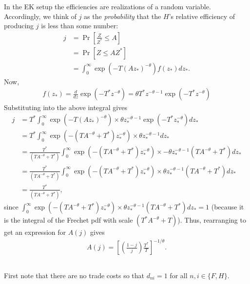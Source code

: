 \documentclass[12pt]{article}
\begin{document}
In the EK setup the efficiencies are realizations of a random variable. Accordingly, we think of $j$ as the \textit{probability} that the $H$'s relative efficiency of producing $j$ is less than some number:
\begin{align*}
j &= \Pr\left[\frac{Z}{Z^*} \leq A\right]\\
&=\Pr\left[Z \leq AZ^*\right]\\
&= \int_0^\infty \exp(-T(Az_*)^{-\theta}) f(z_*)dz_*.
\end{align*}
Now,
\begin{align*}
f(z_*) = \frac{d}{dz} \exp(-T^*z^{-\theta}) = \theta T^*z^{-\theta-1}\exp(-T^*z^{-\theta})
\end{align*}
Substituting into the above integral gives
\begin{align*}
j &= T^*\int_0^\infty \exp(-T(Az_*)^{-\theta}) \times \theta z_*^{-\theta-1}\exp(-T^*z_*^{-\theta})dz_*\\
&=T^*\int_0^\infty \exp(-(TA^{-\theta}+T^*)z_*^{-\theta}) \times\theta z_*^{-\theta-1}dz_*\\
&= \frac{T^*}{(TA^{-\theta}+T^*)} \int_0^\infty \exp(-(TA^{-\theta}+T^*)z_*^{-\theta}) \times -\theta z_*^{-\theta-1}(TA^{-\theta}+T^*)dz_*\\
&=\frac{T^*}{(TA^{-\theta}+T^*)} \int_0^\infty \exp(-(TA^{-\theta}+T^*)z_*^{-\theta}) \times \theta z_*^{-\theta-1}(TA^{-\theta}+T^*)dz_*\\
&=\frac{T^*}{(TA^{-\theta}+T^*)},
\end{align*}
since $ \int_0^\infty \exp(-(TA^{-\theta}+T^*)z_*^{-\theta}) \times \theta z_*^{-\theta-1}(TA^{-\theta}+T^*)dz_* = 1$ (because it is the integral of the Frechet pdf with scale $(T^*A^{-\theta}+T)$). Thus, rearranging to get an expression for $A(j)$ gives
\begin{align}
A(j) = \left[\left(\frac{1-j}{j}\right)\frac{T^*}{T}\right]^{-1/\theta}. \label{eq:EK0}
\end{align}

\newpage

\subsection{}
First note that there are no trade costs so that $d_{ni} = 1$ for all $n,i \in \{F,H\}$.\\
\end{document}
